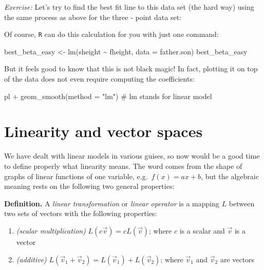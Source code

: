 \documentclass[
  letterpaper,
  DIV=11,
  numbers=noendperiod]{scrreprt}
\newenvironment{Shaded}{\begin{snugshade}}{\end{snugshade}}
\newcommand{\NormalTok}[1]{\textcolor[rgb]{0.00,0.23,0.31}{#1}}
\providecommand{\tightlist}{%
  \setlength{\itemsep}{0pt}\setlength{\parskip}{0pt}}\usepackage{longtable,booktabs,array}
\begin{document}
\emph{Exercise:} Let's try to find the best fit line to this data set
(the hard way) using the same process as above for the three - point
data set:

\begin{Shaded}
\begin{Highlighting}[]

\end{Highlighting}
\end{Shaded}

Of course, \texttt{R} can do this calculation for you with just one
command:

\begin{Shaded}
\begin{Highlighting}[]
\NormalTok{best\_beta\_easy \textless{}{-} lm(sheight \textasciitilde{} fheight, data = father.son)}
\NormalTok{best\_beta\_easy}
\end{Highlighting}
\end{Shaded}

But it feels good to know that this is not black magic! In fact,
plotting it on top of the data does not even require computing the
coefficients:

\begin{Shaded}
\begin{Highlighting}[]
\NormalTok{pl + geom\_smooth(method = "lm") \# lm stands for linear model}
\end{Highlighting}
\end{Shaded}

\section{Linearity and vector spaces}\label{linearity-and-vector-spaces}

We have dealt with linear models in various guises, so now would be a
good time to define properly what linearity means. The word comes from
the shape of graphs of linear functions of one variable,
e.g.~\(f(x) = a x + b\), but the algebraic meaning rests on the
following two general properties:

\textbf{Definition.} A \emph{linear transformation} or \emph{linear
operator} is a mapping \(L\) between two sets of vectors with the
following properties:

\begin{enumerate}
\def\labelenumi{\arabic{enumi}.}
\tightlist
\item
  \emph{(scalar multiplication)} \(L(c \vec v) = c L(\vec v)\); where
  \(c\) is a scalar and \(\vec v\) is a vector
\item
  \emph{(additive)}
  \(L(\vec v_1 + \vec v_2) = L(\vec v_1) + L(\vec v_2)\); where
  \(\vec v_1\) and \(\vec v_2\) are vectors
\end{enumerate}
\end{document}
